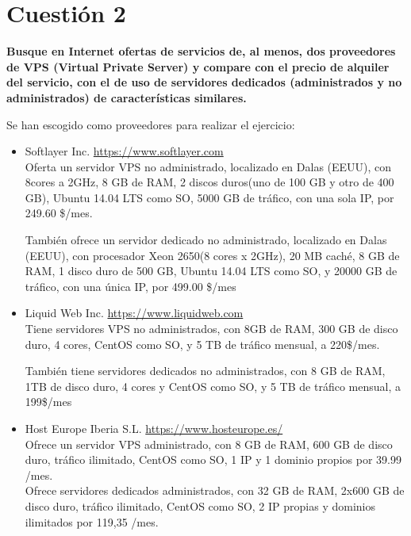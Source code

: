 \documentclass[a4paper,11pt]{article}
\newenvironment{answer}{%
\begin{list}{}{%
}%
\item[]}{\end{list}}
\begin{document}
\section{Cuestión 2}
\textbf{Busque en Internet ofertas de servicios de, al menos, dos proveedores de
VPS (Virtual Private Server) y compare con el precio de alquiler del servicio, con el de
uso de servidores dedicados (administrados y no administrados) de características
similares.}
\begin{answer}
 Se han escogido como proveedores para realizar el ejercicio:
 \begin{itemize}
  \item Softlayer Inc.  \url{https://www.softlayer.com}\\
   Oferta un servidor VPS no administrado, localizado en Dalas (EEUU), con 8cores a 2GHz, 8 GB de RAM, 2 discos duros(uno de 
   100 GB y otro de 400 GB), Ubuntu 14.04 LTS como SO, 5000 GB de tráfico, con una sola IP, por 249.60 \$/mes.
  
   También ofrece un servidor dedicado no administrado, localizado en Dalas (EEUU), con procesador Xeon 2650(8 cores x 2GHz), 20 MB caché,
   8 GB de RAM, 1 disco duro de 500 GB, Ubuntu 14.04 LTS como SO, y 20000 GB de tráfico, con una única IP, por 499.00 \$/mes
  \item Liquid Web Inc. \url{https://www.liquidweb.com}\\
   Tiene servidores VPS no administrados, con 8GB de RAM, 300 GB de disco duro, 4 cores, CentOS como SO, y 5 TB de tráfico mensual, a 220\$/mes.
   
   También tiene servidores dedicados no administrados, con 8 GB de RAM, 1TB de disco duro, 4 cores y CentOS como SO, y 5 TB de tráfico mensual, a 199\$/mes
  \item Host Europe Iberia S.L. \url{https://www.hosteurope.es/}\\
   Ofrece un servidor VPS administrado, con 8 GB de RAM, 600 GB de disco duro, tráfico ilimitado, CentOS como SO,
   1 IP y 1 dominio propios por 39.99 /mes.\\
   Ofrece servidores dedicados administrados, con 32 GB de RAM, 2x600 GB de disco duro, tráfico ilimitado, CentOS como
   SO, 2 IP propias y dominios ilimitados por 119,35 /mes.
 \end{itemize}
\end{answer}
\end{document}
